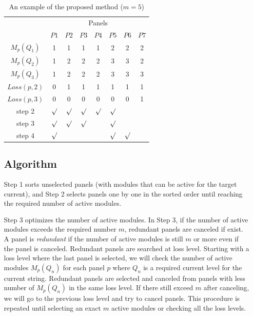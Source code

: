 \documentclass[conference]{pvsctran}
\begin{document}
\begin{table}[t]
\caption{An example of the proposed method ($m = 5$)}
\begin{center}
\begin{tabular}{c|c|ccccc|c}\hline \hline
                               & \multicolumn{7}{c}{Panels}  \\
                               &  \multicolumn{1}{c}{$P1$}    & $P2$   & $P3$    & $P4$    & $P5$   & \multicolumn{1}{c}{$P6$}            & $P7$             \\ \hline
$M_{p}(Q_1)$        & 1     & 1     & 1     & 1     & 2    & 2    & 2              \\ \hline
$M_{p}(Q_2)$        & 1     & 2     & 2     & 2     & 3    & 3    & 2              \\ \hline
$M_{p}(Q_3)$        & 1     & 2     & 2     & 2     & 3    & 3    & 3              \\ \hline
$Loss(p,2)$           & 0     & 1     & 1     & 1     & 1    & 1    & 1    \\ \hline
$Loss(p,3)$           & 0     & 0     & 0     & 0     & 0    & 0    & 1    \\ \hline\hline
step 2        & $\surd$ & $\surd$ &$\surd$ &$\surd$ &$\surd$ & & \\ \hline
step 3      & $\surd$ & $\surd$ &$\surd$ & &$\surd$ & & \\ \hline
step 4       & $\surd$ &  & & &$\surd$ & $\surd$ & \\ \hline         
\end{tabular}
\end{center}
\label{tab:proposed-example}
\end{table}

\subsection{Algorithm}
Step 1 sorts unselected panels (with modules that can be active for the target current), and Step 2 selects panels one by one in the sorted order until reaching the required number of active modules.  

Step 3 optimizes the number of active modules. 
In Step 3, if the number of active modules exceeds the required number $m$, redundant panels are canceled if exist. 
A panel is \textit{redundant} if the number of active modules is still $m$ or more even if the panel is canceled.  
Redundant panels are searched at loss level. 
Starting with a loss level where the last panel is selected, we will check the number of active modules $M_{p}(Q_{n})$ for each panel $p$ 
where $Q_{n}$ is a required current level for the current string.
Redundant panels are selected and canceled from panels with less number of $M_{p}(Q_{n})$ in the same loss level. 
If there still exceed $m$ after canceling, we will go to the previous loss level and try to cancel panels.
This procedure is repeated until selecting an exact $m$ active modules or checking all the loss levels.
\end{document}
